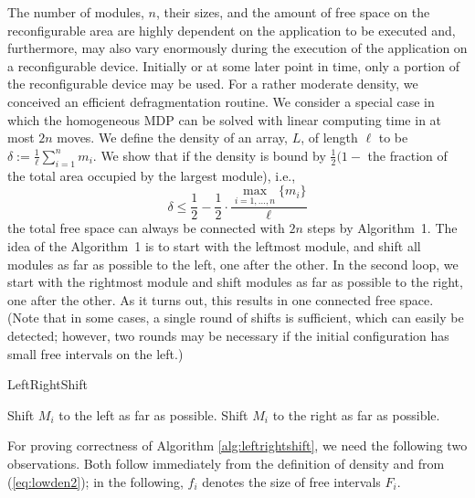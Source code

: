 \documentclass{article}
\begin{document}
The number of modules, $n$, their sizes, and the amount of free space on
the reconfigurable area are highly dependent on the application to be
executed and, furthermore, may also vary enormously during the execution of the application on a reconfigurable device. Initially or
at some later point in time, only a portion of the reconfigurable
device may be used. For a rather moderate density, we
conceived an efficient defragmentation routine.
We consider a special case in
which the homogeneous MDP can be solved with linear computing time in at most
$2n$ moves. We define the density of an array, $L$, of length $\ell$ 
to be $\delta := \frac{1}{\ell}\sum_{i=1}^n m_i$. We show that if
the density is bound by 
$\frac12(1-$ the fraction of the total area occupied by the largest module),
i.e.,
\begin{equation}
\delta \leq \frac{1}{2} - \frac{1}{2} \cdot\frac{\max_{i=1,\ldots,n}\{m_i\}}
{\ell}
\label{eq:lowden2}
\end{equation}
the total free space can always be connected with $2n$ steps by 
Algorithm~1.
The idea of the Algorithm~1 is to start with the leftmost module,
and shift all modules as far as possible to the left,
one after the other. In the second loop, we start with the 
rightmost module and shift modules as far as possible
to the right, one after the other. As it turns out, this results in one
connected free space. (Note that in some cases, a single round of shifts
is sufficient, which can easily be detected; however, two rounds may be necessary
if the initial configuration has small free intervals on the left.)

\begin{algorithm}[h!]\caption{LeftRightShift}
\label{alg:leftrightshift}

\SetLine





 {
Shift $M_i$ to the left as far as possible.}  {
        Shift $M_i$ to the right as far as possible.}

\end{algorithm}

For proving correctness 
of Algorithm \ref{alg:leftrightshift}, 
we need the following two observations.
Both follow immediately from
the definition of density and from (\ref{eq:lowden2}); in the following,
$f_i$ denotes the size of free intervals $F_i$.
\end{document}
